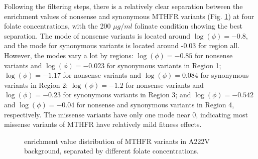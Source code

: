 \documentclass{article}
\begin{document}
Following the filtering steps, there is a relatively clear separation between the enrichment values of nonsense and synonymous MTHFR variants (Fig. \ref{fig:enrichment MTHFR}) at four folate concentrations, with the 200 $\mu g / ml$ folinate condition showing the best separation. The mode of nonsense variants is located around $\log(\phi)=-0.8$, and the mode for synonymous variants is located around -0.03 for region all. However, the modes vary a lot by regions: $\log(\phi)=-0.85$ for nonsense variants and $\log(\phi)=-0.023$ for synonymous variants in Region 1; $\log(\phi)=-1.17$ for nonsense variants and $\log(\phi)=0.084$ for synonymous variants in Region 2; $\log(\phi)=-1.2$ for nonsense variants and $\log(\phi)=-0.23$ for synonymous variants in Region 3; and $\log(\phi)=-0.542$ and $\log(\phi)=-0.04$ for nonsense and synonymous variants in Region 4, respectively. The missense variants have only one mode near 0, indicating most missense variants of MTHFR have relatively mild fitness effects.

\begin{figure}[H]%
    \centering
    \qquad
    \qquad
    \qquad
    \caption{enrichment value distribution of MTHFR variants in A222V background, separated by different folate concentrations.}%
    \label{fig:enrichment MTHFR}%
\end{figure}
\end{document}
